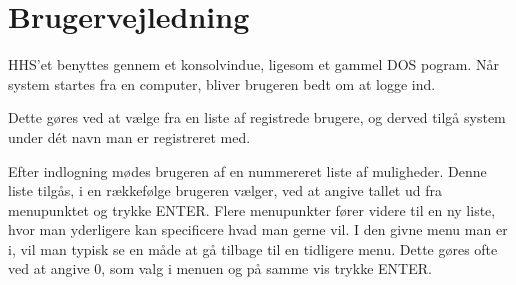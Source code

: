 
\section{Brugervejledning}

HHS'et benyttes gennem et konsolvindue, ligesom et gammel DOS pogram.
Når system startes fra en computer, bliver brugeren bedt om at logge ind.

Dette gøres ved at vælge fra en liste af registrede brugere, og derved tilgå system under dét navn man er registreret med.

Efter indlogning  mødes brugeren af en nummereret liste af muligheder.
Denne liste tilgås, i en rækkefølge brugeren vælger, ved at angive tallet ud fra menupunktet og trykke ENTER.
Flere menupunkter fører videre til en ny liste, hvor man yderligere kan specificere hvad man gerne vil.
I den givne menu man er i, vil man typisk se en måde at gå tilbage til en tidligere menu.
Dette gøres ofte ved at angive 0, som valg i menuen og på samme vis trykke ENTER.
